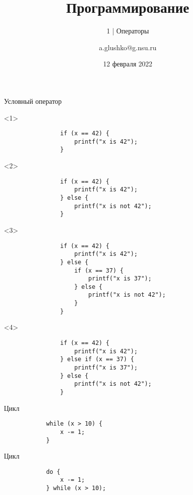 \documentclass[aspectratio=169,14pt]{beamer}
\title{Программирование}
\subtitle{1 | Операторы}
\author{a.glushko@g.nsu.ru}
\date{12 февраля 2022}
\begin{document}
    \begin{frame}
        \titlepage
    \end{frame}

    \begin{frame}[fragile]{Условный оператор}
        \begin{onlyenv}<1>
            \begin{verbatim}
                if (x == 42) {
                    printf("x is 42");
                }
            \end{verbatim}
        \end{onlyenv}
        \begin{onlyenv}<2>
            \begin{verbatim}
                if (x == 42) {
                    printf("x is 42");
                } else {
                    printf("x is not 42");
                }
            \end{verbatim}
        \end{onlyenv}
        \begin{onlyenv}<3>
            \begin{verbatim}
                if (x == 42) {
                    printf("x is 42");
                } else {
                    if (x == 37) {
                        printf("x is 37");
                    } else {
                        printf("x is not 42");
                    }
                }
            \end{verbatim}
        \end{onlyenv}
        \begin{onlyenv}<4>
            \begin{verbatim}
                if (x == 42) {
                    printf("x is 42");
                } else if (x == 37) {
                    printf("x is 37");
                } else {
                    printf("x is not 42");
                }
            \end{verbatim}
        \end{onlyenv}
    \end{frame}

    \begin{frame}[fragile]{Цикл}
        \begin{verbatim}
            while (x > 10) {
                x -= 1;
            }
        \end{verbatim}
    \end{frame}

    \begin{frame}[fragile]{Цикл}
        \begin{verbatim}
            do {
                x -= 1;
            } while (x > 10);
        \end{verbatim}
    \end{frame}
\end{document}
